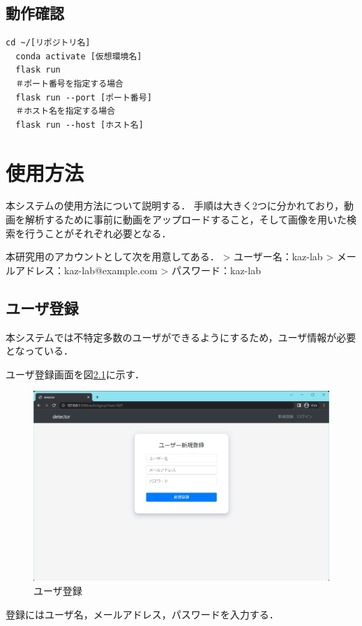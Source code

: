 \documentclass[a4j,12pt,dvipdfmx]{jreport}
\begin{document}
\section{動作確認}
\begin{lstlisting}[caption=hoge,label=fuga]
  cd ~/[リポジトリ名]
  conda activate [仮想環境名]
  flask run
  ＃ポート番号を指定する場合
  flask run --port [ポート番号]
  ＃ホスト名を指定する場合
  flask run --host [ホスト名]
\end{lstlisting}

\chapter{使用方法}
\label{sec:usage}
本システムの使用方法について説明する．
手順は大きく2つに分かれており，動画を解析するために事前に動画をアップロードすること，そして画像を用いた検索を行うことがそれぞれ必要となる．

本研究用のアカウントとして次を用意してある．
> ユーザー名：kaz-lab
> メールアドレス：kaz-lab@example.com
> パスワード：kaz-lab

\section{ユーザ登録}
本システムでは不特定多数のユーザができるようにするため，ユーザ情報が必要となっている．

ユーザ登録画面を図\ref{fig:user_register}に示す．

\begin{figure}[H]
  \centering
  \includegraphics[width=13cm]{image/user_register.jpg}
  \caption{ユーザ登録}
  \label{fig:user_register}
\end{figure}

登録にはユーザ名，メールアドレス，パスワードを入力する．
\end{document}
